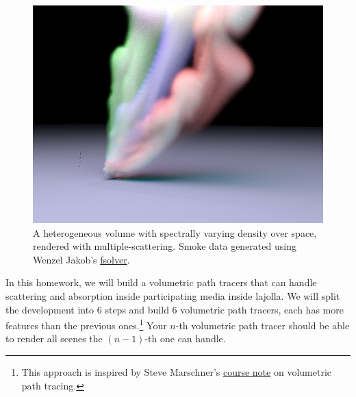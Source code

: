 




\begin{figure}[h]
    \includegraphics[width=\linewidth]{imgs/colored_smoke.png}
    \caption{A heterogeneous volume with spectrally varying density over space, rendered with multiple-scattering. Smoke data generated using Wenzel Jakob's \href{http://www.mitsuba-renderer.org/misc.html}{fsolver}.}
    \label{fig:gallery}
\end{figure}

In this homework, we will build a volumetric path tracers that can handle scattering and absorption inside participating media inside lajolla. We will split the development into 6 steps and build 6 volumetric path tracers, each has more features than the previous ones.\footnote{This approach is inspired by Steve Marschner's \href{https://www.cs.cornell.edu/courses/cs6630/2015fa/notes/10volpath.pdf}{course note} on volumetric path tracing.} Your $n$-th volumetric path tracer should be able to render all scenes the $(n-1)$-th one can handle.

